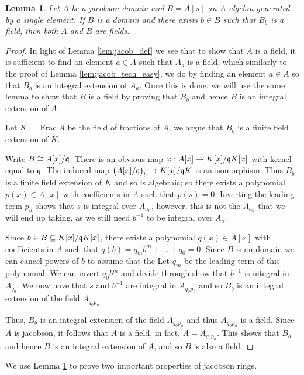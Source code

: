 \documentclass[12pt]{article}
\theoremstyle{plain}
\newtheorem{lemma}[thm]{Lemma}
\theoremstyle{definition}
\begin{document}
	\begin{lemma}\label{lem:jacob_tech_hard}
		Let $A$ be a jacobson domain and $B = A[s]$ an $A$-algebra generated by a single element. If $B$ is a domain and there exists $b \in B$ such that $B_b$ is a field, then both $A$ and $B$ are fields.
	\end{lemma}
	\begin{proof}
		In light of Lemma \ref{lem:jacob_def} we see that to show that $A$ is a field, it is sufficient to find an element $a \in A$ such that $A_a$ is a field, which similarly to the proof of Lemma \ref{lem:jacob_tech_easy}, we do by finding an element $a \in A$ so that $B_b$ is an integral extension of $A_a$. Once this is done, we will use the same lemma to show that $B$ is a field by proving that $B_b$ and hence $B$ is an integral extension of $A$.
		
		Let $K = \operatorname{Frac}A$ be the field of fractions of $A$, we argue that $B_b$ is a finite field extension of $K$.
		
		Write $B \cong A[x]/\frak{q}$. There is an obvious map $\varphi: A[x] \to K[x]/\frak{q}K[x]$ with kernel equal to $\frak{q}$. The induced map $\big(A[x]/\frak{q}\big)_b \to K[x]/\frak{q}K$ is an isomorphism. Thus $B_b$ is a finite field extension of $K$ and so is algebraic; so there exists a polynomial $p(x) \in A[x]$ with coefficients in $A$ such that $p(s) = 0$. Inverting the leading term $p_{n}$ shows that $s$ is integral over $A_{a_n}$, however, this is not the $A_{a_n}$ that we will end up taking, as we still need $b^{-1}$ to be integral over $A_{a}$.
		
		Since $b \in B \subseteq K[x]/\frak{q}K[x]$, there exists a polynomial $q(x) \in A[x]$ with coefficients in $A$ such that $q(b) = q_mb^m + \hdots + q_0 = 0$. Since $B$ is an domain we can cancel powers of $b$ to assume that the Let $q_{m}$ be the leading term of this polynomial. We can invert $q_{0}b^m$ and divide through show that $b^{-1}$ is integral in $A_{q_0}$. We now have that $s$ and $b^{-1}$ are integral in $A_{q_0p_n}$ and so $B_b$ is an integral extension of the field $A_{q_0p_n}$.
		
		Thus, $B_b$ is an integral extension of the field $A_{q_0p_n}$ and thus $A_{q_0p_n}$ is a field. Since $A$ is jacobson, it follows that $A$ is a field, in fact, $A = A_{q_0p_n}$. This shows that $B_b$ and hence $B$ is an integral extension of $A$, and so $B$ is also a field. 
	\end{proof}
	We use Lemma \ref{lem:jacob_tech_hard} to prove two important properties of jacobson rings.
\end{document}
